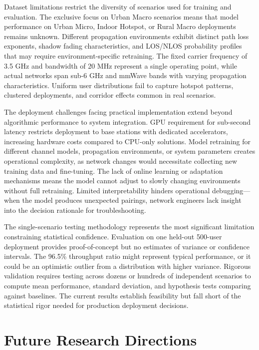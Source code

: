 Dataset limitations restrict the diversity of scenarios used for training and evaluation. The exclusive focus on Urban Macro scenarios means that model performance on Urban Micro, Indoor Hotspot, or Rural Macro deployments remains unknown. Different propagation environments exhibit distinct path loss exponents, shadow fading characteristics, and LOS/NLOS probability profiles that may require environment-specific retraining. The fixed carrier frequency of 3.5 GHz and bandwidth of 20 MHz represent a single operating point, while actual networks span sub-6 GHz and mmWave bands with varying propagation characteristics. Uniform user distributions fail to capture hotspot patterns, clustered deployments, and corridor effects common in real scenarios.

The deployment challenges facing practical implementation extend beyond algorithmic performance to system integration. GPU requirement for sub-second latency restricts deployment to base stations with dedicated accelerators, increasing hardware costs compared to CPU-only solutions. Model retraining for different channel models, propagation environments, or system parameters creates operational complexity, as network changes would necessitate collecting new training data and fine-tuning. The lack of online learning or adaptation mechanisms means the model cannot adjust to slowly changing environments without full retraining. Limited interpretability hinders operational debugging—when the model produces unexpected pairings, network engineers lack insight into the decision rationale for troubleshooting.

The single-scenario testing methodology represents the most significant limitation constraining statistical confidence. Evaluation on one held-out 500-user deployment provides proof-of-concept but no estimates of variance or confidence intervals. The 96.5\% throughput ratio might represent typical performance, or it could be an optimistic outlier from a distribution with higher variance. Rigorous validation requires testing across dozens or hundreds of independent scenarios to compute mean performance, standard deviation, and hypothesis tests comparing against baselines. The current results establish feasibility but fall short of the statistical rigor needed for production deployment decisions.

\section{Future Research Directions}

